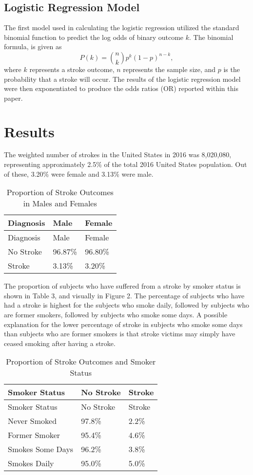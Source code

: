 \documentclass[11pt,]{article}
\begin{document}
\subsection{Logistic Regression Model}\label{logistic-regression-model}

The first model used in calculating the logistic regression utilized the
standard binomial function to predict the log odds of binary outcome
\(k\). The binomial formula, is given as
\[P(k)={n \choose k}p^{k}(1-p)^{n-k},\] where \(k\) represents a stroke
outcome, \(n\) represents the sample size, and \(p\) is the probability
that a stroke will occur. The results of the logistic regression model
were then exponentiated to produce the odds ratios (OR) reported within
this paper.

\section{Results}\label{results}

The weighted number of strokes in the United States in 2016 was
8,020,080, representing approximately 2.5\% of the total 2016 United
States population. Out of these, 3.20\% were female and 3.13\% were
male.

\begin{longtable}[]{@{}lll@{}}
\caption{Proportion of Stroke Outcomes in Males and
Females}\tabularnewline
\toprule
Diagnosis & Male & Female\tabularnewline
\midrule
\endfirsthead
\toprule
Diagnosis & Male & Female\tabularnewline
\midrule
\endhead
No Stroke & 96.87\% & 96.80\%\tabularnewline
Stroke & 3.13\% & 3.20\%\tabularnewline
\bottomrule
\end{longtable}

The proportion of subjects who have suffered from a stroke by smoker
status is shown in Table 3, and visually in Figure 2. The percentage of
subjects who have had a stroke is highest for the subjects who smoke
daily, followed by subjects who are former smokers, followed by subjects
who smoke some days. A possible explanation for the lower percentage of
stroke in subjects who smoke some days than subjects who are former
smokers is that stroke victims may simply have ceased smoking after
having a stroke.

\begin{longtable}[]{@{}lll@{}}
\caption{Proportion of Stroke Outcomes and Smoker Status}\tabularnewline
\toprule
Smoker Status & No Stroke & Stroke\tabularnewline
\midrule
\endfirsthead
\toprule
Smoker Status & No Stroke & Stroke\tabularnewline
\midrule
\endhead
Never Smoked & 97.8\% & 2.2\%\tabularnewline
Former Smoker & 95.4\% & 4.6\%\tabularnewline
Smokes Some Days & 96.2\% & 3.8\%\tabularnewline
Smokes Daily & 95.0\% & 5.0\%\tabularnewline
\bottomrule
\end{longtable}
\end{document}
